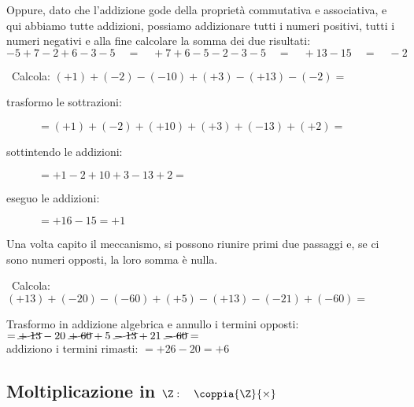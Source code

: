 Oppure, dato che l'addizione gode della proprietà commutativa e associativa, 
e qui abbiamo tutte addizioni,
possiamo addizionare tutti i numeri positivi, tutti i numeri negativi e alla 
fine calcolare la somma dei due risultati:
\[-5+7-2+6-3-5 \quad=\quad +7+6-5-2-3-5 \quad=\quad +13 -15 \quad=\quad -2\]

\begin{esempio}{}{}
~Calcola: \((+1)+(-2)-(-10)+(+3)-(+13)-(-2)=\) 
\begin{description}
\item [trasformo le sottrazioni: \quad ] 
\(=(+1)+(-2)+(+10)+(+3)+(-13)+(+2)=\)
\item [sottintendo le addizioni: \quad ] \(=+1-2+10+3-13+2=\)
\item [eseguo le addizioni: \qquad ~~\, ] \(=+16-15=+1\)
\end{description}
\end{esempio}

Una volta capito il meccanismo, si possono riunire primi due passaggi 
e, se ci sono numeri opposti, la loro somma è nulla.

\begin{esempio}{}{}
~Calcola: \\
\((+13)+(-20)-(-60)+(+5)-(+13)-(-21)+(-60)=\) 

Trasformo in addizione algebrica e annullo i termini opposti:\\
\(=\cancel{+\;13}-20~\cancel{+\;60}+5~\cancel{-\;13}+21~\cancel{-\;60}=\)\\
addiziono i termini rimasti:\hspace{15.3mm}
\(= +26 - 20 = +6\)
\end{esempio}


\subsection{Moltiplicazione in 
\texorpdfstring{$\Z: \quad \coppia{\Z}{\times}$}{Z: (Z; x)}}

